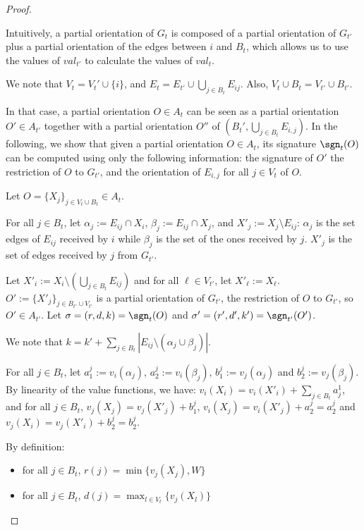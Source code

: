 \documentclass[11pt,letterpaper]{article}
\begin{document}
\begin{proof}
\begin{lemma}
    \end{lemma}

    Intuitively, a partial orientation of $G_t$ is composed of a partial orientation of $G_{t'}$ plus a partial orientation of the edges between $i$ and $B_t$, which allows us to use the values of $val_{t'}$ to calculate the values of $val_t$.

    \begin{nestedproof}

    We note that $V_t=V_t'\cup \{i\}$, and $E_t=E_{t'}\cup \bigcup_{j\in B_t} E_{ij}$. Also, $V_t\cup B_t=V_{t'}\cup B_{t'}$.

    In that case, a partial orientation $O\in A_t$ can be seen as a partial orientation $O'\in A_{t'}$ together with a partial orientation $O''$ of $(B_t',\bigcup_{j\in B_t} E_{i,j})$. In the following, we show that given a partial orientation $O\in A_t$, its signature $\sgn_t(O)$ can be computed using only the following information: the signature of $O'$ the restriction of $O$ to $G_{t'}$, and the orientation of $E_{i,j}$ for all $j\in V_t$ of $O$.

    Let $O=\{X_j\}_{j\in V_t\cup B_t}\in A_t$.

    For all $j\in B_t$, let $\alpha_j:=E_{ij}\cap X_i$, $\beta_j:=E_{ij}\cap X_j$, and $X'_j:=X_j\setminus E_{ij}$: $\alpha_j$ is the set edges of $E_{ij}$ received by $i$ while $\beta_j$ is the set of the ones received by $j$. $X'_j$ is the set of edges received by $j$ from $G_{t'}$.

    Let $X'_i:=X_i\setminus (\bigcup_{j\in B_t}E_{ij})$ and for all $\ell\in V_{t'}$, let $X'_\ell:=X_\ell$.  $O':= \{X'_j\}_{j\in B_{t'}\cup V_{t'}}$ is a partial orientation of $G_{t'}$, the restriction of $O$ to $G_{t'}$, so $O'\in A_{t'}$. Let $\sigma=(r,d,k)=\sgn_t(O)$ and $\sigma'=(r',d',k')=\sgn_{t'}(O')$.

    We note that $k=k'+\sum_{j\in B_t}|E_{ij}\setminus(\alpha_j\cup\beta_j)|$.

    For all $j\in B_t$, let $a^j_1:= v_i(\alpha_j)$, $a^j_2:= v_i(\beta_j)$, $b^j_1:= v_j(\alpha_j)$ and $b^j_2:= v_j(\beta_j)$. By linearity of the value functions, we have: $v_i(X_i)=v_i(X'_i)+\sum_{j\in B_t}a_j^1$, and for all $j\in B_t$, $v_j(X_j)=v_j(X'_j)+b^j_1$, $v_i(X_j)=v_i(X'_j)+a_2^j=a_2^j$ and $v_j(X_i)=v_j(X'_i)+b_2^j=b_2^j$.

    By definition:\begin{itemize}
        \item for all $j\in B_t$, $r(j)=\min\{v_{j}(X_{j}),W\}$
        \item for all $j\in B_t$, $d(j)=\max_{l\in V_t}\{v_j(X_l)\}$
    \end{itemize}



\end{nestedproof}
\end{proof}
\end{document}
